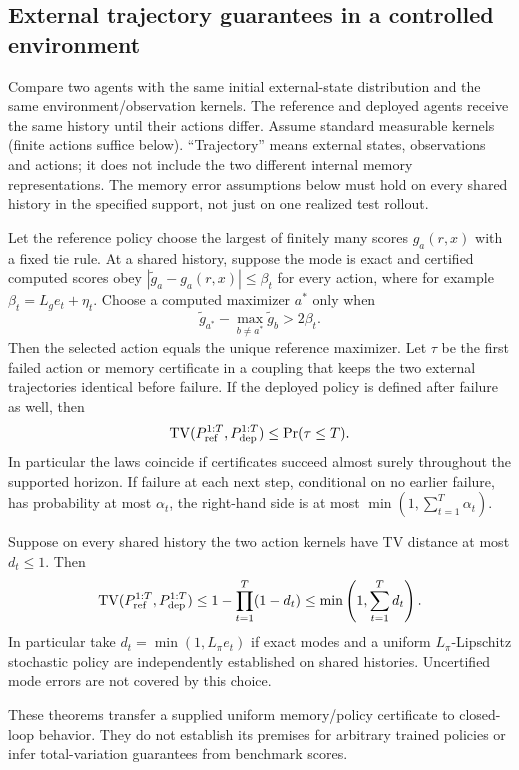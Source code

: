 \subsection{External trajectory guarantees in a controlled environment}
Compare two agents with the same initial external-state distribution and
the same environment/observation kernels. The reference and deployed agents
receive the same history until their actions differ. Assume standard
measurable kernels (finite actions suffice below). ``Trajectory'' means
external states, observations and actions; it does not include the two
different internal memory representations. The memory error assumptions
below must hold on every shared history in the specified support, not just
on one realized test rollout.

\begin{theorem}
\label{III:M:thm:guarded-policy}
Let the reference policy choose the largest of finitely many scores
$g_a(r,x)$ with a fixed tie rule. At a shared history, suppose the mode is
exact and certified computed scores obey
$|\widetilde g_a-g_a(r,x)|\le\beta_t$ for every action, where for example
$\beta_t=L_g e_t+\eta_t$. Choose a computed maximizer $a^*$ only when
\[
 \widetilde g_{a^*}-\max_{b\ne a^*}\widetilde g_b>2\beta_t.
\]
Then the selected action equals the unique reference maximizer.
Let $\tau$ be the first failed action or memory certificate in a coupling
that keeps the two external trajectories identical before failure. If the
deployed policy is defined after failure as well, then
\[
 \operatorname{TV}(P_{\rm ref}^{1:T},P_{\rm dep}^{1:T})
 \le\Pr(\tau\le T).
\]
In particular the laws coincide if certificates succeed almost surely
throughout the supported horizon. If failure at each next step, conditional
on no earlier failure, has probability at most $\alpha_t$, the right-hand
side is at most $\min(1,\sum_{t=1}^T\alpha_t)$.
\end{theorem}


\begin{theorem}\label{III:M:thm:stochastic-policy}
Suppose on every shared history the two action kernels have TV distance
at most $d_t\le1$. Then
\[
 \operatorname{TV}(P_{\rm ref}^{1:T},P_{\rm dep}^{1:T})
 \le1-\prod_{t=1}^T(1-d_t)
 \le\min\left(1,\sum_{t=1}^Td_t\right).
\]
In particular take $d_t=\min(1,L_\pi e_t)$ if exact modes and a uniform
$L_\pi$-Lipschitz stochastic policy are independently established on
shared histories. Uncertified mode errors are not covered by this choice.
\end{theorem}

These theorems transfer a supplied uniform memory/policy certificate to
closed-loop behavior. They do not establish its premises for arbitrary
trained policies or infer total-variation guarantees from benchmark scores.

